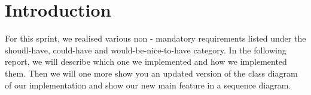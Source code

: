 \section{Introduction}

For this sprint, we realised various non - mandatory requirements listed under the shoudl-have, could-have and would-be-nice-to-have category. In the following report, we will describe which one we implemented and how we implemented them. Then we will one more show you an updated version of  the class diagram of our implementation and show our new main feature in a sequence diagram.
